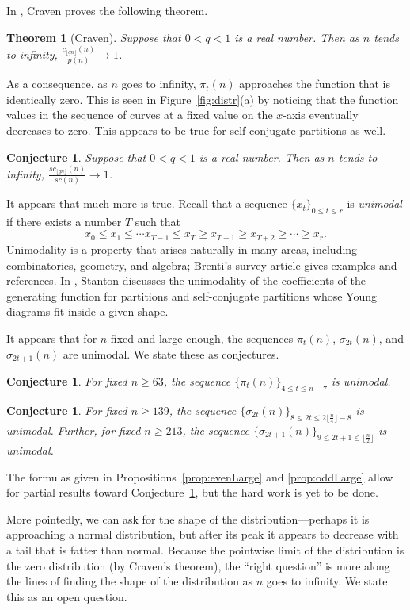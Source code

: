 \documentclass[12pt,leqno]{amsart}
\newtheorem{conj}[lem]{Conjecture}
\newtheorem*{thrm}{Theorem}
\numberwithin{equation}{section}
\theoremstyle{definition}
\begin{document}
In \cite{Craven}, Craven proves the following theorem.
\begin{thrm}[Craven]
Suppose that $0<q<1$ is a real number. Then as $n$ tends to infinity, $\displaystyle \frac{c_{\lfloor qn\rfloor}(n)}{p(n)}\rightarrow 1$.
\end{thrm}
As a consequence, as $n$ goes to infinity, $\pi_t(n)$ approaches the function that is identically zero.  This is seen in Figure~\ref{fig:distr}(a) by noticing that the function values in the sequence of curves at a fixed value on the $x$-axis eventually decreases to zero.  This appears to be true for self-conjugate partitions as well.

\begin{conj}
Suppose that $0<q<1$ is a real number. Then as $n$ tends to infinity, $\displaystyle \frac{sc_{\lfloor qn\rfloor}(n)}{sc(n)}\rightarrow 1$.
\end{conj}

It appears that much more is true.  Recall that a sequence $\{x_t\}_{0\leq t\leq r}$ is {\em unimodal} if there exists a number $T$ such that \[x_0\leq x_1 \leq \cdots x_{T-1} \leq x_T \geq x_{T+1} \geq x_{T+2} \geq \cdots \geq x_r.\]
Unimodality is a property that arises naturally in many areas, including combinatorics, geometry, and algebra; Brenti's survey article \cite{Unimo} gives examples and references. In \cite{Stanton}, Stanton discusses the unimodality of the coefficients of the generating function for partitions and self-conjugate partitions whose Young diagrams fit inside a given shape. 

It appears that for $n$ fixed and large enough, the sequences $\pi_t(n)$, $\sigma_{2t}(n)$, and $\sigma_{2t+1}(n)$ are unimodal.  We state these as conjectures.
\begin{conj}
For fixed $n\geq 63$, the sequence $\{\pi_t(n)\}_{4\leq t\leq n-7}$ is unimodal.
\end{conj}
\begin{conj}
\label{conj:unimodal}
For fixed $n\geq 139$, the sequence $\{\sigma_{2t}(n)\}_{8\leq 2t\leq 2\lfloor \frac{n}{4}\rfloor-8}$ is unimodal.  Further, for fixed $n\geq 213$, the sequence $\{\sigma_{2t+1}(n)\}_{9\leq 2t+1\leq \lfloor \frac{n}{2}\rfloor}$ is unimodal.
\end{conj}
The formulas given in Propositions~\ref{prop:evenLarge} and \ref{prop:oddLarge} allow for partial results toward Conjecture~\ref{conj:unimodal}, but the hard work is yet to be done.  

More pointedly, we can ask for the shape of the distribution---perhaps it is approaching a normal distribution, but after its peak it appears to decrease with a tail that is fatter than normal.  Because the pointwise limit of the distribution is the zero distribution (by Craven's theorem), the ``right question'' is more along the lines of finding the shape of the distribution as $n$ goes to infinity.  We state this as an open question.
\end{document}
